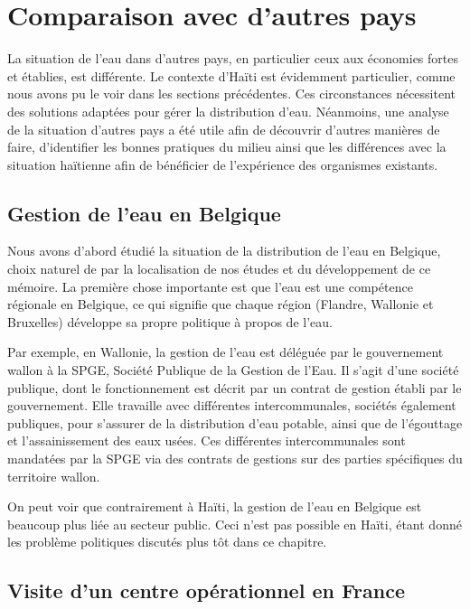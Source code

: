 \documentclass{EPL-master-thesis-covers-FR}
\begin{document}
		\section{Comparaison avec d'autres pays}

			La situation de l'eau dans d'autres pays, en particulier ceux aux économies fortes et établies, est différente. Le contexte d'Haïti est évidemment particulier, comme nous avons pu le voir dans les sections précédentes. Ces circonstances nécessitent des solutions adaptées pour gérer la distribution d'eau. Néanmoins, une analyse de la situation d'autres pays a été utile afin de découvrir d'autres manières de faire, d'identifier les bonnes pratiques du milieu ainsi que les différences avec la situation haïtienne afin de bénéficier de l'expérience des organismes existants.

			\subsection*{Gestion de l'eau en Belgique}

				Nous avons d'abord étudié la situation de la distribution de l'eau en Belgique, choix naturel de par la localisation de nos études et du développement de ce mémoire. La première chose importante est que l'eau est une compétence régionale en Belgique, ce qui signifie que chaque région (Flandre, Wallonie et Bruxelles) développe sa propre politique à propos de l'eau.

				Par exemple, en Wallonie, la gestion de l'eau est déléguée par le gouvernement wallon à la SPGE, Société Publique de la Gestion de l'Eau. Il s'agit d'une société publique, dont le fonctionnement est décrit par un contrat de gestion établi par le gouvernement. Elle travaille avec différentes intercommunales, sociétés également publiques, pour s'assurer de la distribution d'eau potable, ainsi que de l'égouttage et l'assainissement des eaux usées. Ces différentes intercommunales sont mandatées par la SPGE via des contrats de gestions sur des parties spécifiques du territoire wallon.


				On peut voir que contrairement à Haïti, la gestion de l'eau en Belgique est beaucoup plus liée au secteur public. Ceci n'est pas possible en Haïti, étant donné les problème politiques discutés plus tôt dans ce chapitre.

			\subsection*{Visite d'un centre opérationnel en France}
\end{document}

